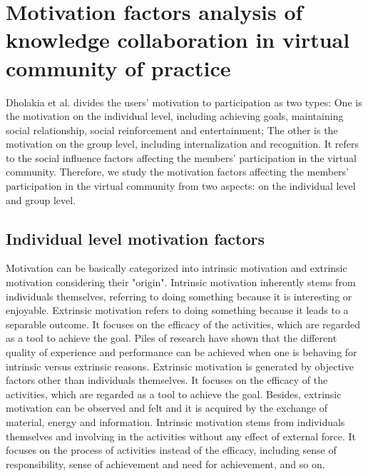 \documentclass{elsarticle}
\begin{document}
\section{Motivation factors analysis of knowledge collaboration in virtual community of practice}
\label{sec:motiv-fact-analys}


 Dholakia et al. \cite{dholakia2004241}divides the users’ motivation to participation as two types: One is the motivation on the individual level, including achieving goals, maintaining social relationship, social reinforcement and entertainment; The other is the motivation on the group level, including internalization and recognition. It refers to the social influence factors affecting the members’ participation in the virtual community. Therefore, we study the motivation factors affecting the members’ participation in the virtual community from two aspects: on the individual level and group level.  

\subsection{Individual level motivation factors}
\label{sec:individual-level}

Motivation can be basically categorized into intrinsic motivation and
extrinsic motivation considering their "origin". Intrinsic motivation
inherently  stems from individuals themselves, referring to doing something because it is interesting or enjoyable. Extrinsic motivation refers to doing something
because it leads to a separable outcome.  It focuses on the efficacy
of the activities, which are regarded as a tool to achieve the goal. Piles of research have
shown that the different quality of experience and performance can be achieved
when one is behaving for intrinsic versus extrinsic
reasons\cite{Ryan200054}.  Extrinsic motivation is generated by
objective factors other than individuals themselves. It focuses on the
efficacy of the activities, which are regarded as a tool to achieve
the goal. Besides, extrinsic motivation can be observed and felt and
it is acquired by the exchange of material, energy and
information. Intrinsic motivation stems from individuals themselves
and involving in the activities without any effect of external
force. It focuses on the process of activities instead of the
efficacy, including sense of responsibility, sense of achievement and
need for achievement, and so on. 
\end{document}
